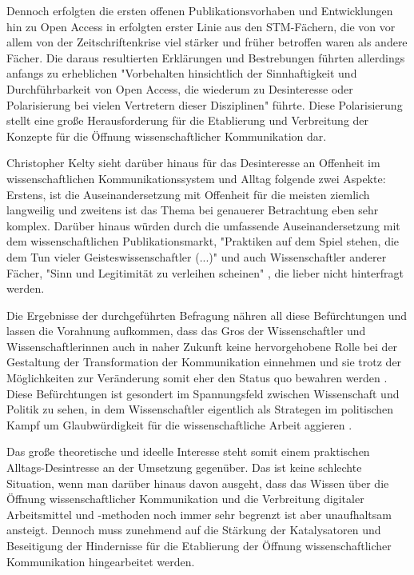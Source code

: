 Dennoch erfolgten die ersten offenen Publikationsvorhaben und Entwicklungen hin zu Open Access in erfolgten erster Linie aus den STM-Fächern, die von vor allem von der Zeitschriftenkrise viel stärker und früher betroffen waren als andere Fächer. Die daraus resultierten Erklärungen und Bestrebungen führten allerdings anfangs zu erheblichen "Vorbehalten hinsichtlich der Sinnhaftigkeit und Durchführbarkeit von Open Access, die wiederum zu Desinteresse oder Polarisierung bei vielen Vertretern dieser Disziplinen" \cite{naeder_2010_open} führte. Diese Polarisierung stellt eine große Herausforderung für die Etablierung und Verbreitung der Konzepte für die Öffnung wissenschaftlicher Kommunikation dar.

Christopher Kelty sieht darüber hinaus für das Desinteresse an Offenheit im wissenschaftlichen Kommunikationssystem und Alltag folgende zwei Aspekte: Erstens, ist die Auseinandersetzung mit Offenheit für die meisten ziemlich langweilig und zweitens ist das Thema bei genauerer Betrachtung eben sehr komplex. Darüber hinaus würden durch die umfassende Auseinandersetzung mit dem wissenschaftlichen Publikationsmarkt, "Praktiken auf dem Spiel stehen, die dem Tun vieler Geisteswissenschaftler (...)" und auch Wissenschaftler anderer Fächer, "Sinn und Legitimität zu verleihen scheinen" \cite{Hirschi_2015_buch_oa}, die lieber nicht hinterfragt werden.

Die Ergebnisse der durchgeführten Befragung nähren all diese Befürchtungen und lassen die Vorahnung aufkommen, dass das Gros der Wissenschaftler und Wissenschaftlerinnen auch in naher Zukunft keine hervorgehobene Rolle bei der Gestaltung der Transformation der Kommunikation einnehmen und sie trotz der Möglichkeiten zur Veränderung somit eher den Status quo bewahren werden \cite{nosek_2012_scientific}. Diese Befürchtungen ist gesondert im Spannungsfeld zwischen Wissenschaft und Politik zu sehen, in dem Wissenschaftler eigentlich als Strategen im politischen Kampf um Glaubwürdigkeit für die wissenschaftliche Arbeit aggieren \cite{latour_2013_laboratory}.

Das große theoretische und ideelle Interesse steht somit einem praktischen Alltags-Desintresse an der Umsetzung gegenüber. Das ist keine schlechte Situation, wenn man darüber hinaus davon ausgeht, dass das Wissen über die Öffnung wissenschaftlicher Kommunikation und die Verbreitung digitaler Arbeitsmittel und -methoden noch immer sehr begrenzt ist aber unaufhaltsam ansteigt. Dennoch muss zunehmend auf die Stärkung der Katalysatoren und Beseitigung der Hindernisse für die Etablierung der Öffnung wissenschaftlicher Kommunikation hingearbeitet werden.

